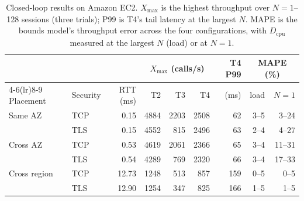 \begin{table}[t]
\centering
\caption{Closed-loop results on Amazon EC2. $X_{\max}$ is the highest throughput over $N = 1$--128 sessions (three trials); P99 is T4's tail latency at the largest $N$. MAPE is the bounds model's throughput error across the four configurations, with $D_{\mathrm{cpu}}$ measured at the largest $N$ (load) or at $N = 1$.}
\label{tab:aws-throughput}
\footnotesize
\setlength{\tabcolsep}{2.1pt}
\begin{tabular}{ll r rrr r rr}
\toprule
 & & & \multicolumn{3}{c}{$X_{\max}$ (calls/s)} & T4 P99 & \multicolumn{2}{c}{MAPE (\%)} \\
\cmidrule(lr){4-6}\cmidrule(lr){8-9}
Placement & Security & RTT (ms) & T2 & T3 & T4 & (ms) & load & $N{=}1$ \\
\midrule
Same AZ & TCP & 0.15 & 4884 & 2203 & 2508 & 62 & 3--5 & 3--24 \\
 & TLS & 0.15 & 4552 & 815 & 2496 & 63 & 2--4 & 4--27 \\
\addlinespace
Cross AZ & TCP & 0.53 & 4619 & 2061 & 2366 & 65 & 3--4 & 11--31 \\
 & TLS & 0.54 & 4289 & 769 & 2320 & 66 & 3--4 & 17--33 \\
\addlinespace
Cross region & TCP & 12.73 & 1248 & 513 & 857 & 159 & 0--5 & 0--5 \\
 & TLS & 12.90 & 1254 & 347 & 825 & 166 & 1--5 & 1--5 \\
\bottomrule
\end{tabular}
\end{table}
